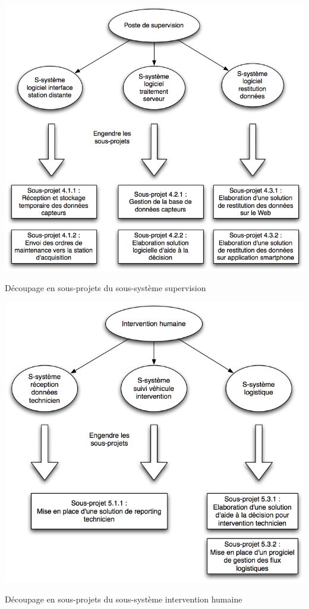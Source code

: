 \begin {center}
\includegraphics[width=\textwidth]{png/ss4Supervision.png}
\caption{Découpage en sous-projets du sous-système supervision}
\end {center}
\begin {center}

\includegraphics[width=\textwidth]{png/ss5IH.png}
\caption{Découpage en sous-projets du sous-système intervention humaine}
\end {center}


